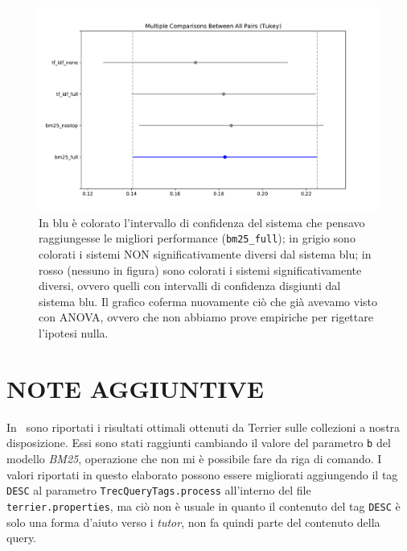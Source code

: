 \documentclass[letterpaper, 10 pt, conference]{ieeeconf}  %
\begin{document}
\begin{figure}[h!]
    \centering
    \includegraphics[scale=0.4]{figures/tukey_maps.pdf}
    
    \caption{In blu è colorato l'intervallo di confidenza del sistema che pensavo raggiungesse le migliori performance (\texttt{bm25\_full}); in grigio sono colorati i sistemi NON significativamente diversi dal sistema blu; in rosso (nessuno in figura) sono colorati i sistemi significativamente diversi, ovvero quelli con intervalli di confidenza disgiunti dal sistema blu. Il grafico coferma nuovamente ciò che già avevamo visto con ANOVA, ovvero che non abbiamo prove empiriche per rigettare l'ipotesi nulla.}
    \label{fig:tukey_maps}
\end{figure}

\section{NOTE AGGIUNTIVE}\label{notes}
In~\cite{optimal} sono riportati i risultati ottimali ottenuti da Terrier sulle collezioni a nostra disposizione. Essi sono stati raggiunti cambiando il valore del parametro \texttt{b} del modello \textit{BM25}, operazione che non mi è possibile fare da riga di comando.   
I valori riportati in questo elaborato possono essere migliorati aggiungendo il tag \texttt{DESC} al parametro \texttt{TrecQueryTags.process} all'interno del file \texttt{terrier.properties}, ma ciò non è usuale in quanto il contenuto del tag \texttt{DESC} è solo una forma d'aiuto verso i \textit{tutor}, non fa quindi parte del contenuto della query.

\addtolength{\textheight}{-12cm}   %
\end{document}
